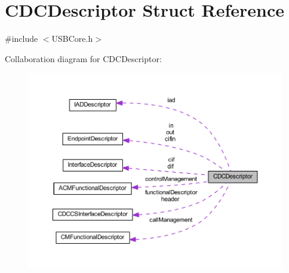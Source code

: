 \hypertarget{struct_c_d_c_descriptor}{}\section{C\+D\+C\+Descriptor Struct Reference}
\label{struct_c_d_c_descriptor}


{\ttfamily \#include $<$U\+S\+B\+Core.\+h$>$}



Collaboration diagram for C\+D\+C\+Descriptor\+:
\nopagebreak
\begin{figure}[H]
\begin{center}
\leavevmode
\includegraphics[width=350pt]{struct_c_d_c_descriptor__coll__graph}
\end{center}
\end{figure}
